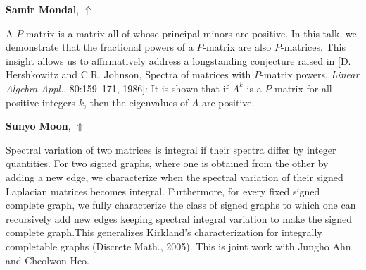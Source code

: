 \documentclass[ILAS2025-program.tex]{subfiles}
\begin{document}
\hypertarget{down0104}{}\begin{ilasabstract}
    
\textbf{Samir Mondal},  \hfill \hyperlink{up0104}{$\Uparrow$}
    
    
\mtskip
    A $P$-matrix is a matrix all of whose principal minors are positive. In this talk, we demonstrate that the fractional 
powers of a $P$-matrix are also $P$-matrices. This insight allows us to affirmatively address a 
longstanding conjecture raised in [D. Hershkowitz and C.R. Johnson, Spectra of matrices with
$P$-matrix powers, {\it Linear Algebra Appl.}, 80:159--171, 1986]: It is shown that if $A^k$ is a $P$-matrix 
for all positive integers $k$, then the eigenvalues of $A$ are positive.

\end{ilasabstract}
    

\hypertarget{down0086}{}\begin{ilasabstract}
    
\textbf{Sunyo Moon},  \hfill \hyperlink{up0086}{$\Uparrow$}
    
    
\mtskip
    Spectral variation of two matrices is integral if their spectra differ by integer quantities. For two signed graphs, where one is obtained from the other by adding a new edge, we characterize when the spectral variation of their signed Laplacian matrices becomes integral. Furthermore, for every fixed signed complete graph, we fully characterize the class of signed graphs to which one can recursively add new edges keeping spectral integral variation to make the signed complete graph.This generalizes Kirkland's characterization for integrally completable graphs (Discrete Math., 2005). This is joint work with Jungho Ahn and Cheolwon Heo.

\end{ilasabstract}
    
\end{document}
